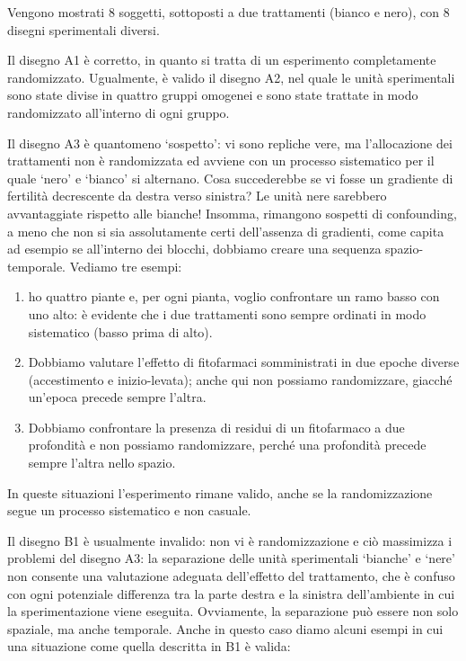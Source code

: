 \documentclass[a4paper,12pt,oneside]{book}
\providecommand{\tightlist}{%
  \setlength{\itemsep}{0pt}\setlength{\parskip}{0pt}}
\begin{document}
Vengono mostrati 8 soggetti, sottoposti a due trattamenti (bianco e nero), con 8 disegni sperimentali diversi.

Il disegno A1 è corretto, in quanto si tratta di un esperimento completamente randomizzato. Ugualmente, è valido il disegno A2, nel quale le unità sperimentali sono state divise in quattro gruppi omogenei e sono state trattate in modo randomizzato all'interno di ogni gruppo.

Il disegno A3 è quantomeno `sospetto': vi sono repliche vere, ma l'allocazione dei trattamenti non è randomizzata ed avviene con un processo sistematico per il quale `nero' e `bianco' si alternano. Cosa succederebbe se vi fosse un gradiente di fertilità decrescente da destra verso sinistra? Le unità nere sarebbero avvantaggiate rispetto alle bianche! Insomma, rimangono sospetti di confounding, a meno che non si sia assolutamente certi dell'assenza di gradienti, come capita ad esempio se all'interno dei blocchi, dobbiamo creare una sequenza spazio-temporale. Vediamo tre esempi:

\begin{enumerate}
\def\labelenumi{\arabic{enumi}.}
\tightlist
\item
  ho quattro piante e, per ogni pianta, voglio confrontare un ramo basso con uno alto: è evidente che i due trattamenti sono sempre ordinati in modo sistematico (basso prima di alto).
\item
  Dobbiamo valutare l'effetto di fitofarmaci somministrati in due epoche diverse (accestimento e inizio-levata); anche qui non possiamo randomizzare, giacché un'epoca precede sempre l'altra.
\item
  Dobbiamo confrontare la presenza di residui di un fitofarmaco a due profondità e non possiamo randomizzare, perché una profondità precede sempre l'altra nello spazio.
\end{enumerate}

In queste situazioni l'esperimento rimane valido, anche se la randomizzazione segue un processo sistematico e non casuale.

Il disegno B1 è usualmente invalido: non vi è randomizzazione e ciò massimizza i problemi del disegno A3: la separazione delle unità sperimentali `bianche' e `nere' non consente una valutazione adeguata dell'effetto del trattamento, che è confuso con ogni potenziale differenza tra la parte destra e la sinistra dell'ambiente in cui la sperimentazione viene eseguita. Ovviamente, la separazione può essere non solo spaziale, ma anche temporale. Anche in questo caso diamo alcuni esempi in cui una situazione come quella descritta in B1 è valida:
\end{document}
